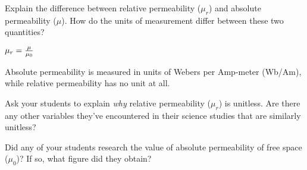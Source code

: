 

Explain the difference between relative permeability ($\mu_r$) and absolute permeability ($\mu$).  How do the units of measurement differ between these two quantities?







$\mu_r = {\mu \over \mu_0}$

\vskip 10pt

Absolute permeability is measured in units of Webers per Amp-meter (Wb/Am), while relative permeability has no unit at all.







Ask your students to explain {\it why} relative permeability ($\mu_r$) is unitless.  Are there any other variables they've encountered in their science studies that are similarly unitless?

Did any of your students research the value of absolute permeability of free space ($\mu_0$)?  If so, what figure did they obtain?




